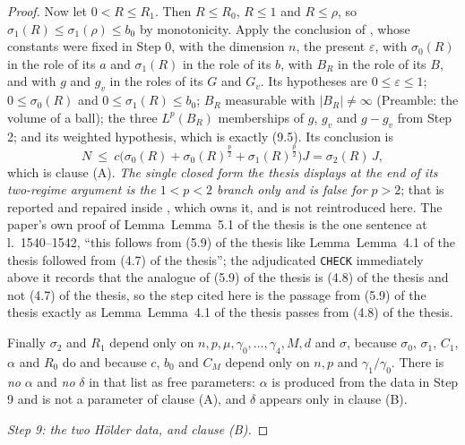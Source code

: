 \begin{proof}
Now let $0<R\le R_1$.  Then $R\le R_0$, $R\le1$ and $R\le\rho$, so
$\sigma_1(R)\le\sigma_1(\rho)\le b_0$ by monotonicity.  Apply the conclusion of
, whose constants were fixed in Step 0,
with the dimension $n$, the present $\varepsilon$, with $\sigma_0(R)$ in the
role of its $a$ and $\sigma_1(R)$ in the role of its $b$, with $B_R$ in the role
of its $B$, and with $g$ and $g_v$ in the roles of its $G$ and $G_v$.  Its
hypotheses are $0\le\varepsilon\le1$; $0\le\sigma_0(R)$ and
$0\le\sigma_1(R)\le b_0$; $B_R$ measurable with $|B_R|\ne\infty$ (Preamble: the
volume of a ball); the three $L^p(B_R)$ memberships of $g$, $g_v$ and $g-g_v$
from Step 2; and its weighted hypothesis, which is exactly (9.5).  Its
conclusion is
\[
N\ \le\ c\bigl(\sigma_0(R)+\sigma_0(R)^{\frac p2}+\sigma_1(R)^{\frac p2}\bigr)J
=\sigma_2(R)\,J ,
\]
which is clause (A).  \emph{The single closed form the thesis displays at the
end of its two-regime argument is the $1<p<2$ branch only and is false for
$p>2$}; that is reported and repaired inside
, which owns it, and is not reintroduced
here.  The paper's own proof of Lemma~Lemma~5.1 of the thesis is the one sentence at
l.~1540--1542, ``this follows from (5.9) of the thesis like Lemma~Lemma~4.1 of the thesis
followed from (4.7) of the thesis''; the adjudicated \texttt{CHECK} immediately above
it records that the analogue of (5.9) of the thesis is (4.8) of the thesis and not
(4.7) of the thesis, so the step cited here is the passage from (5.9) of the thesis
exactly as Lemma~Lemma~4.1 of the thesis passes from (4.8) of the thesis.

Finally $\sigma_2$ and $R_1$ depend only on
$n,p,\mu,\gamma_0,\dots,\gamma_4,M,d$ and $\sigma$, because $\sigma_0$,
$\sigma_1$, $C_1$, $\alpha$ and $R_0$ do and because $c$, $b_0$ and $C_M$ depend
only on $n,p$ and $\gamma_1/\gamma_0$.  There is \emph{no} $\alpha$ and
\emph{no} $\delta$ in that list as free parameters: $\alpha$ is produced from the
data in Step 9 and is not a parameter of clause (A), and $\delta$ appears only
in clause (B).

\medskip
\noindent\emph{Step 9: the two H\"older data, and clause \textup{(B)}.}


\end{proof}
